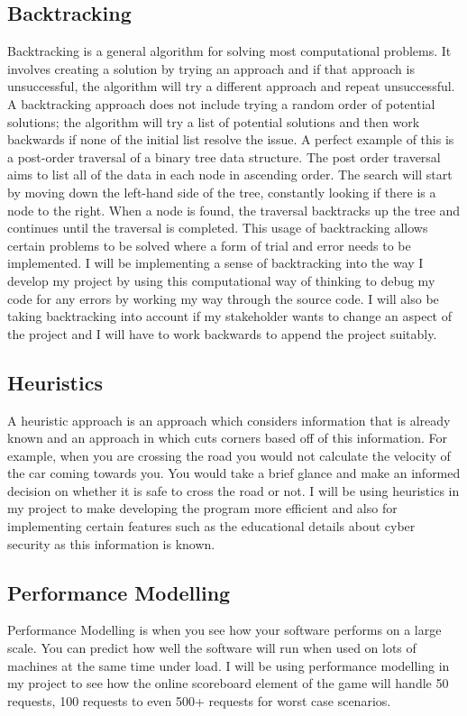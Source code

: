 \documentclass[12pt]{report}
\begin{document}
\subsection{Backtracking}
Backtracking is a general algorithm for solving most computational problems. It involves creating a solution by trying an approach and if that approach is unsuccessful, the algorithm will try a different approach and repeat unsuccessful. A backtracking approach does not include trying a random order of potential solutions; the algorithm will try a list of potential solutions and then work backwards if none of the initial list resolve the issue. A perfect example of this is a post-order traversal of a binary tree data structure. The post order traversal aims to list all of the data in each node in ascending order. The search will start by moving down the left-hand side of the tree, constantly looking if there is a node to the right. When a node is found, the traversal backtracks up the tree and continues until the traversal is completed. This usage of backtracking allows certain problems to be solved where a form of trial and error needs to be implemented. I will be implementing a sense of backtracking into the way I develop my project by using this computational way of thinking to debug my code for any errors by working my way through the source code. I will also be taking backtracking into account if my stakeholder wants to change an aspect of the project and I will have to work backwards to append the project suitably.

\pagebreak

\subsection{Heuristics}
A heuristic approach is an approach which considers information that is already known and an approach in which cuts corners based off of this information. For example, when you are crossing the road you would not calculate the velocity of the car coming towards you. You would take a brief glance and make an informed decision on whether it is safe to cross the road or not. I will be using heuristics in my project to make developing the program more efficient and also for implementing certain features such as the educational details about cyber security as this information is known.

\subsection{Performance Modelling}
Performance Modelling is when you see how your software performs on a large scale. You can predict how well the software will run when used on lots of machines at the same time under load. I will be using performance modelling in my project to see how the online scoreboard element of the game will handle 50 requests, 100 requests to even 500+ requests for worst case scenarios. 
\end{document}
